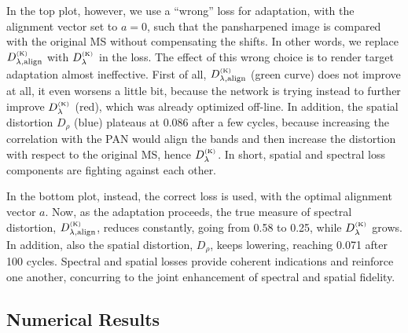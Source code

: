 \documentclass[journal]{IEEEtran}
\newcommand{\DL} {D^{_{\rm (K)}}_\lambda}
\newcommand{\DLa}{D^{_{\rm (K)}}_{\lambda, \rm align}}
\newcommand{\DR} {D_{\rho}}
\begin{document}
In the top plot, however, we use a ``wrong'' loss for adaptation, with the alignment vector set to $a=0$,
such that the pansharpened image is compared with the original MS without compensating the shifts.
In other words, we replace $\DLa$ with $\DL$ in the loss.
The effect of this wrong choice is to render target adaptation almost ineffective.
First of all, $\DLa$ (green curve) does not improve at all, it even worsens a little bit,
because the network is trying instead to further improve $\DL$ (red), which was already optimized off-line.
In addition,
the spatial distortion $\DR$ (blue) plateaus at 0.086 after a few cycles,
because increasing the correlation with the PAN would align the bands and then increase the distortion with respect to the original MS, hence $\DL$.
In short, spatial and spectral loss components are fighting against each other.

In the bottom plot, instead, the correct loss is used, with the optimal alignment vector $a$.
Now, as the adaptation proceeds, the true measure of spectral distortion, $\DLa$, reduces constantly, going from 0.58 to 0.25,
while $\DL$ grows.
In addition, also the spatial distortion, $\DR$, keeps lowering, reaching 0.071 after 100 cycles.
Spectral and spatial losses provide coherent indications and reinforce one another, concurring to the joint enhancement of spectral and spatial fidelity.

\subsection{Numerical Results}

\newcommand{\za}[1]{\textbf{#1}}
\newcommand{\zb}[1]{\underline{#1}}
\newcommand{\zr}{\rule{0mm}{3.5mm}}
\end{document}
